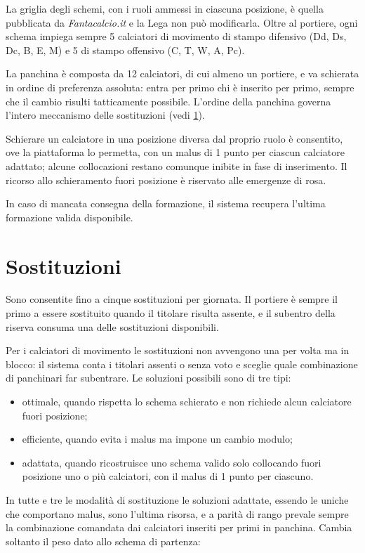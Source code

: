 La griglia degli schemi, con i ruoli ammessi in ciascuna posizione, è quella pubblicata da \emph{Fantacalcio.it} e la Lega non può modificarla. Oltre al portiere, ogni schema impiega sempre 5 calciatori di movimento di stampo difensivo (Dd, Ds, Dc, B, E, M) e 5 di stampo offensivo (C, T, W, A, Pc).

La panchina è composta da 12 calciatori, di cui almeno un portiere, e va schierata in ordine di preferenza assoluta: entra per primo chi è inserito per primo, sempre che il cambio risulti tatticamente possibile. L'ordine della panchina governa l'intero meccanismo delle sostituzioni (vedi \ref{art:4.5}).

Schierare un calciatore in una posizione diversa dal proprio ruolo è consentito, ove la piattaforma lo permetta, con un malus di 1 punto per ciascun calciatore adattato; alcune collocazioni restano comunque inibite in fase di inserimento. Il ricorso allo schieramento fuori posizione è riservato alle emergenze di rosa.

In caso di mancata consegna della formazione, il sistema recupera l'ultima formazione valida disponibile.

\section{Sostituzioni}
\label{art:4.5}

Sono consentite fino a cinque sostituzioni per giornata. Il portiere è sempre il primo a essere sostituito quando il titolare risulta assente, e il subentro della riserva consuma una delle sostituzioni disponibili.

Per i calciatori di movimento le sostituzioni non avvengono una per volta ma in blocco: il sistema conta i titolari assenti o senza voto e sceglie quale combinazione di panchinari far subentrare. Le soluzioni possibili sono di tre tipi:

\begin{itemize}
\item ottimale, quando rispetta lo schema schierato e non richiede alcun calciatore fuori posizione;
\item efficiente, quando evita i malus ma impone un cambio modulo;
\item adattata, quando ricostruisce uno schema valido solo collocando fuori posizione uno o più calciatori, con il malus di 1 punto per ciascuno.
\end{itemize}

In tutte e tre le modalità di sostituzione le soluzioni adattate, essendo le uniche che comportano malus, sono l'ultima risorsa, e a parità di rango prevale sempre la combinazione comandata dai calciatori inseriti per primi in panchina. Cambia soltanto il peso dato allo schema di partenza:

